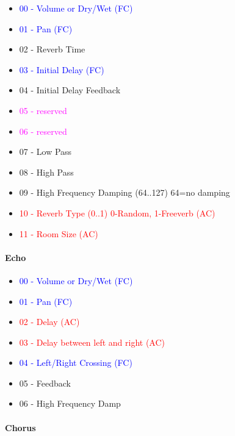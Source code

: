    \begin{itemize}
      \item \textcolor{blue}{00 - Volume or Dry/Wet (FC)}
      \item \textcolor{blue}{01 - Pan (FC)}
      \item 02 - Reverb Time
      \item \textcolor{blue}{03 - Initial Delay (FC)}
      \item 04 - Initial Delay Feedback
      \item \textcolor{magenta}{05 - reserved}
      \item \textcolor{magenta}{06 - reserved}
      \item 07 - Low Pass
      \item 08 - High Pass
      \item 09 - High Frequency Damping (64..127) 64=no damping
      \item \textcolor{red}{10 - Reverb Type (0..1) 0-Random, 1-Freeverb (AC)}
      \item \textcolor{red}{11 - Room Size (AC)}
   \end{itemize}

\paragraph{Echo}

   \begin{itemize}
      \item \textcolor{blue}{00 - Volume or Dry/Wet (FC)}
      \item \textcolor{blue}{01 - Pan (FC)}
      \item \textcolor{red}{02 - Delay (AC)}
      \item \textcolor{red}{03 - Delay between left and right (AC)}
      \item \textcolor{blue}{04 - Left/Right Crossing (FC)}
      \item 05 - Feedback
      \item 06 - High Frequency Damp
   \end{itemize}

\paragraph{Chorus}

